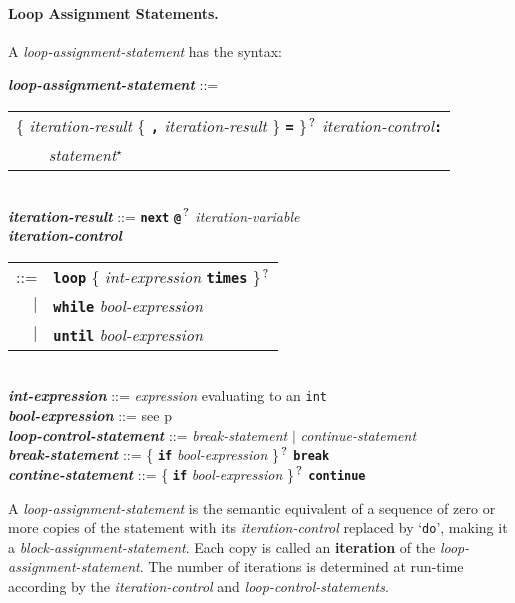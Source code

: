 \documentclass[12pt]{article}
\newcommand{\subsubsubsection}[1]{\paragraph[#1]{#1.}}
\newcommand{\TT}[1]{{\tt \bfseries #1}}
\newcommand{\STAR}{{\Large $^\star$}}
\newcommand{\QMARK}{{$^{\,\mbox{\footnotesize ?}}$}}
\newcommand{\key}[1]{{\rm \bfseries #1}}
\newcommand{\ttkey}[1]{{\tt \bfseries #1}}
\newcommand{\emkey}[1]{{\em \bfseries #1}}
\newcommand{\pagref}[1]{p\pageref{#1}}
\newenvironment{indpar}[1][0.3in]%
	{\begin{list}{}%
		     {\setlength{\itemsep}{0in}%
		      \setlength{\topsep}{0in}%
		      \setlength{\parsep}{1ex}%
		      \setlength{\labelwidth}{#1}%
		      \setlength{\leftmargin}{#1}%
		      \addtolength{\leftmargin}{\labelsep}}%
	 \item}%
	{\end{list}}
\begin{document}
\subsubsubsection{Loop Assignment Statements}
\label{LOOP-ASSIGNMENT-STATEMENTS}

A {\em loop-assignment-statement} has the syntax:

\begin{indpar}
\emkey{loop-assignment-statement} ::= \\
\hspace*{0.5in}\begin{tabular}[t]{l}
        \{ {\em iteration-result} \{ \TT{,} {\em iteration-result} \}
	   \TT{=} \}\QMARK{} {\em iteration-control}\TT{:} \\
	\TT{~~~~}{\em statement}\STAR{} \\
	\end{tabular}
\\[0.5ex]
\emkey{iteration-result}\label{ITERATION-VARIABLE} ::= 
    \TT{next} \TT{@}\QMARK{} {\em iteration-variable}
\\[0.5ex]
\emkey{iteration-control} \begin{tabular}[t]{rl}
	             ::= & \ttkey{loop}
		           \{ {\em int-expression} \ttkey{times} \}\QMARK{} \\
		     $|$ & \ttkey{while} {\em bool-expression} \\
		     $|$ & \ttkey{until} {\em bool-expression} \\
		     \end{tabular}
\\[0.5ex]
\emkey{int-expression} ::= {\em expression} evaluating to an {\tt int}
\\[0.5ex]
\emkey{bool-expression} ::= see \pagref{BOOL-EXPRESSION}
\\[0.5ex]
\emkey{loop-control-statement}\label{LOOP-CONTROL-STATEMENTS} ::=
    {\em break-statement} $|$ {\em continue-statement}
\\[0.5ex]
\emkey{break-statement}\label{BREAK-STATEMENT} ::=
    \{ \TT{if} {\em bool-expression} \}\QMARK{} \ttkey{break}
\\[0.5ex]
\emkey{contine-statement}\label{CONTINUE-STATEMENT} ::=
    \{ \TT{if} {\em bool-expression} \}\QMARK{} \ttkey{continue}
\end{indpar}

A {\em loop-assignment-statement} is the semantic equivalent of
a sequence of zero or more copies of the statement with
its {\em iteration-control} replaced by `{\tt do}', making it
a {\em block-assignment-statement}.  Each copy is called an
\key{iteration} of the {\em loop-assignment-statement}.
The number of iterations is
determined at run-time according by the {\em iteration-control}
and {\em loop-control-statements}.
\end{document}
